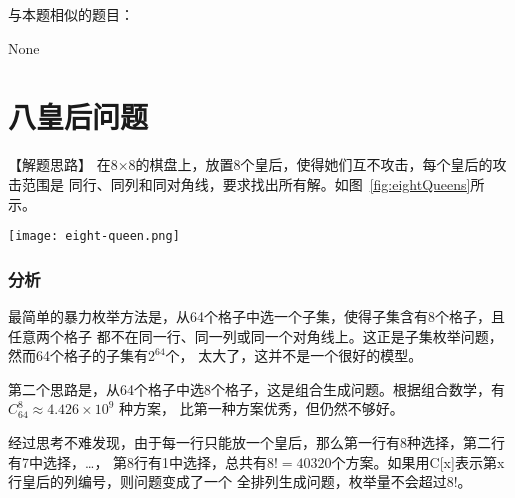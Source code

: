 与本题相似的题目：
\begindot
\item None
\myenddot


\section{八皇后问题} %

【解题思路】
在8×8的棋盘上，放置8个皇后，使得她们互不攻击，每个皇后的攻击范围是
同行、同列和同对角线，要求找出所有解。如图~\ref{fig:eightQueens}所示。

\begin{center}
\texttt{[image: eight-queen.png]} \\
\label{fig:eightQueens}
\end{center}

\subsubsection{分析}
最简单的暴力枚举方法是，从64个格子中选一个子集，使得子集含有8个格子，且任意两个格子
都不在同一行、同一列或同一个对角线上。这正是子集枚举问题，然而64个格子的子集有$2^{64}$个，
太大了，这并不是一个很好的模型。

第二个思路是，从64个格子中选8个格子，这是组合生成问题。根据组合数学，有 $C_{64}^{8} \approx 4.426 \times 10^9$ 种方案，
比第一种方案优秀，但仍然不够好。

经过思考不难发现，由于每一行只能放一个皇后，那么第一行有8种选择，第二行有7中选择，…，
第8行有1中选择，总共有$8!=40320$个方案。如果用C[x]表示第x行皇后的列编号，则问题变成了一个
全排列生成问题，枚举量不会超过8!。

